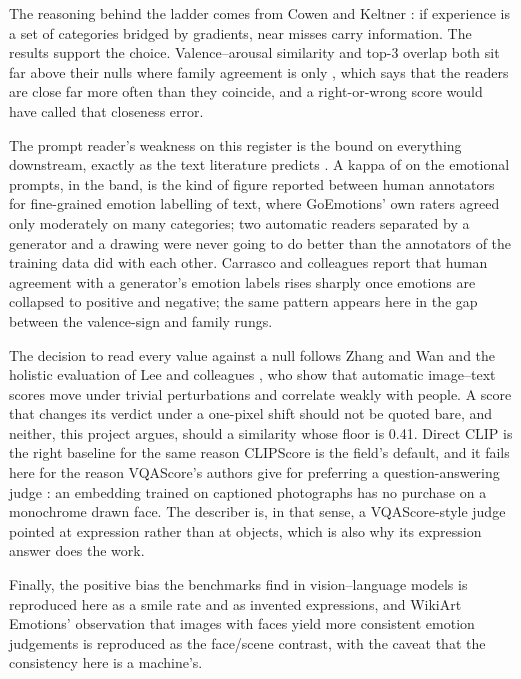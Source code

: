 The reasoning behind the ladder comes from Cowen and Keltner \cite{cowen2017self}: if experience is a set of categories bridged by gradients, near misses carry information. The results support the choice. Valence--arousal similarity and top-3 overlap both sit far above their nulls where family agreement is only \FullEmoFamObs{}, which says that the readers are close far more often than they coincide, and a right-or-wrong score would have called that closeness error.

The prompt reader's weakness on this register is the bound on everything downstream, exactly as the text literature predicts \cite{demszky2020goemotions, yang2023context}. A kappa of \KappaEmo{} on the emotional prompts, in the \KappaEmoBand{} band, is the kind of figure reported between human annotators for fine-grained emotion labelling of text, where GoEmotions' own raters agreed only moderately on many categories; two automatic readers separated by a generator and a drawing were never going to do better than the annotators of the training data did with each other. Carrasco and colleagues \cite{carrasco2024level} report that human agreement with a generator's emotion labels rises sharply once emotions are collapsed to positive and negative; the same pattern appears here in the gap between the valence-sign and family rungs.

The decision to read every value against a null follows Zhang and Wan \cite{zhang2025rethinking} and the holistic evaluation of Lee and colleagues \cite{lee2023holistic}, who show that automatic image--text scores move under trivial perturbations and correlate weakly with people. A score that changes its verdict under a one-pixel shift should not be quoted bare, and neither, this project argues, should a similarity whose floor is 0.41. Direct CLIP is the right baseline for the same reason CLIPScore \cite{hessel2021clipscore} is the field's default, and it fails here for the reason VQAScore's authors give for preferring a question-answering judge \cite{lin2024evaluating}: an embedding trained on captioned photographs has no purchase on a monochrome drawn face. The describer is, in that sense, a VQAScore-style judge pointed at expression rather than at objects, which is also why its expression answer does the work.

Finally, the positive bias the benchmarks find in vision--language models \cite{bhattacharyya2025evaluating} is reproduced here as a smile rate and as invented expressions, and WikiArt Emotions' observation that images with faces yield more consistent emotion judgements \cite{mohammad2018wikiart} is reproduced as the face/scene contrast, with the caveat that the consistency here is a machine's.

